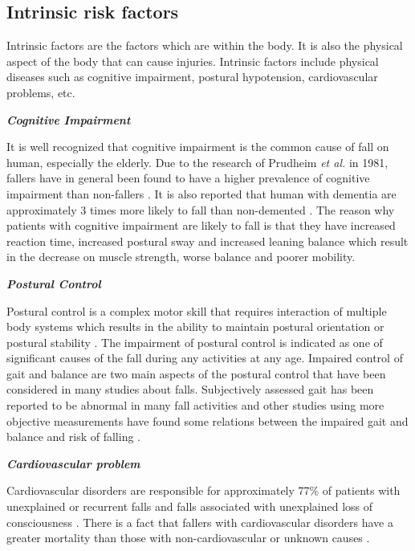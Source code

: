 \documentclass[letterpaper,12pt,titlepage,oneside,final]{book}
\begin{document}
\subsection{Intrinsic risk factors}
Intrinsic factors are the factors which are within the body. It is also the physical aspect of the body that can cause injuries. Intrinsic factors include physical diseases such as cognitive impairment, postural hypotension, cardiovascular problems, etc.\par
\vspace{0.3cm}
\textbf{\textit{Cognitive Impairment}}\par
It is well recognized that cognitive impairment is the common cause of fall on human, especially the elderly. Due to the research of Prudheim \textit{et al.} in 1981, fallers have in general been found to have a higher prevalence of cognitive impairment than non-fallers \cite{cognitive_1}. It is also reported that human with dementia are approximately 3 times more likely to fall than non-demented \cite{cognitive_2}. The reason why patients with cognitive impairment are likely to fall is that they have increased reaction time, increased postural sway and increased leaning balance which result in the decrease on muscle strength, worse balance and poorer mobility. \par
\vspace{0.3cm}
\textbf{\textit{Postural Control}}\par
Postural control is a complex motor skill that requires interaction of multiple body systems which results in the ability to maintain postural orientation or postural stability \cite{postural_1}\cite{postural_2}. The impairment of postural control is indicated as one of significant causes of the fall during any activities at any age. Impaired control of gait and balance are two main aspects of the postural control that have been considered in many studies about falls. Subjectively assessed gait has been reported to be abnormal in many fall activities and other studies using more objective measurements have found some relations between the impaired gait and balance and risk of falling \cite{bibli_book}.

\vspace{0.3cm}
\textbf{\textit{Cardiovascular problem}}\par
Cardiovascular disorders are responsible for approximately 77\% of patients with unexplained or recurrent falls and falls associated with unexplained loss of consciousness \cite{cardio_1}. There is a fact that fallers with cardiovascular disorders have a greater mortality than those with non-cardiovascular or unknown causes \cite{cardio_2}.   
\end{document}
